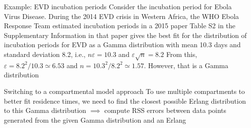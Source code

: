 \documentclass[aspectratio=169]{beamer}
\begin{document}
\begin{frame}{Example: EVD incubation periods}
Consider the incubation period for Ebola Virus Disease. During the 2014 EVD crisis in Western Africa, the WHO Ebola Response Team estimated incubation periods in a 2015 paper
\vfill
Table S2 in the Supplementary Information in that paper gives the best fit for the distribution of incubation periods for EVD as a Gamma distribution with mean 10.3 days and standard deviation 8.2, i.e., $n\varepsilon = 10.3$ and $\varepsilon \sqrt{n}=8.2$
\vfill
From this, $\varepsilon = 8.2^2/10.3 \simeq 6.53$ and $n = 10.3^2/8.2^2 \simeq 1.57$. However, that is a Gamma distribution
\end{frame}

\begin{frame}[fragile]{Switching to a compartmental model approach}
To use multiple compartments to better fit residence times, we need to find the closest possible Erlang distribution to this Gamma distribution
\vfill
$\implies$ compute RSS errors between data points generated from the given Gamma distribution and an Erlang
\vfill 
\begin{knitrout}
\color{fgcolor}\begin{kframe}
\begin{alltt}
 \hlkwb{<-} \hldef{(}\hldef{,}\hldef{,}\hldef{,}\hldef{) \{}
   \hlkwb{<-}     
   \hlkwb{<-} \hlopt{-}\hlopt{^}\hldef{)}
\hldef{\}}
\end{alltt}
\end{kframe}
\end{knitrout}

\end{frame}
\end{document}
